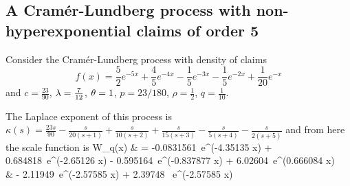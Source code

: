 

\subsection{A Cram\'{e}r-Lundberg process with non-hyperexponential claims of order 5} \label{e:NH5mm}
Consider the Cram\'{e}r-Lundberg process with density of claims $$f(x)=\frac{5}{2 }e^{-5x}+\frac{4}{5} e^{-4 x}-\frac{1}{5}e^{-3x}- \frac{1}{5}e^{-2x}+ \frac{1}{20}e^{-x}$$
and $c=\frac{23}{90}$, $\lambda=\frac{7}{12}$, $\theta= 1$, $p=23/180$, $\rho = \frac{1}{2}$, $q=\frac{1}{10}$.

The Laplace exponent of this process is $ \kappa(s) = \frac{23 s}{90} -\frac{s}{20 (s+1)}+\frac{s}{10 (s+2)}+\frac{s}{15 (s+3)}-\frac{s}{5 (s+4)}-\frac{s}{2 (s+5)}$ and from here the scale function is
\bea
W_q(x) & = -0.0831561\  e^{(-4.35135 x)} + 0.684818\  e^{(-2.65126 x)} - 0.595164\ e^{(-0.837877 x)} + 6.02604\  e^{(0.666084 x)} \\ & - 2.11949\  e^{(-2.57585 x)} \cos[0.811233 x]  + 2.39748 \  e^{(-2.57585 x)} \sin[0.811233 x]
\eea

